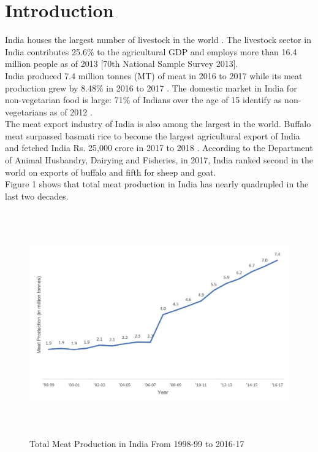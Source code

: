 \documentclass[a4paper, 12pt]{article}
\begin{document}
\newpage
\section{Introduction}
India houses the largest number of livestock in the world \parencite{sharmanews}. The livestock sector in India contributes 25.6\% to the agricultural GDP and employs more than 16.4 million people as of 2013 [70th National Sample Survey 2013].\\

India produced 7.4 million tonnes (MT) of meat in 2016 to 2017 \parencite{dahreport} while its meat production grew by 8.48\% in 2016 to 2017 \parencite{dah1report}. The domestic market in India for non-vegetarian food is large: 71\% of Indians over the age of 15 identify as non-vegetarians as of 2012 \parencite{mspireport}. \\

The meat export industry of India is also among the largest in the world. Buffalo meat surpassed basmati rice to become the largest agricultural export of India and fetched India Rs. 25,000 crore in 2017 to 2018 \parencite{apedastats}. According to the Department of Animal Husbandry, Dairying and Fisheries, in 2017, India ranked second in the world on exports of buffalo and fifth for sheep and goat.\\ 

Figure 1 shows that total meat production in India has nearly quadrupled in the last two decades.\\

\begin{figure}[H]
\centering
\includegraphics[height = 3.8in]{Fig 1.jpg}
\caption{Total Meat Production in India From 1998-99 to 2016-17 \parencite{cmiestats}}
\end{figure}
\end{document}
